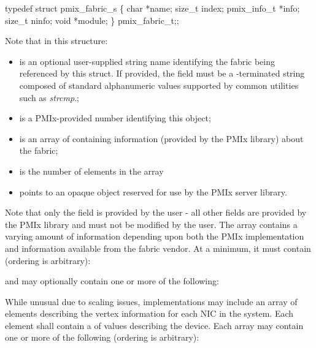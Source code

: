 \cspecificstart
\begin{codepar}
typedef struct pmix_fabric_s \{
    char *name;
    size_t index;
    pmix_info_t *info;
    size_t ninfo;
    void *module;
\} pmix_fabric_t;;
\end{codepar}
\cspecificend

Note that in this structure:

\begin{itemize}
    \item {} is an optional user-supplied string name identifying the fabric being referenced by this struct. If provided, the field must be a -terminated string composed of standard alphanumeric values supported by common utilities such as \textit{strcmp}.;
    \item {} is a \ac{PMIx}-provided number identifying this object;
    \item {} is an array of  containing information (provided by the \ac{PMIx} library) about the fabric;
    \item {} is the number of elements in the  array
    \item {} points to an opaque object reserved for use by the \ac{PMIx} server library.
\end{itemize}

Note that only the  field is provided by the user - all other fields are provided by the \ac{PMIx} library and must not be modified by the user. The  array contains a varying amount of information depending upon both the \ac{PMIx} implementation and information available from the fabric vendor. At a minimum, it must contain (ordering is arbitrary):

\reqattrstart


\reqattrend

and may optionally contain one or more of the following:

\optattrstart
{}

While unusual due to scaling issues, implementations may include an array of  elements describing the vertex information for each \ac{NIC} in the system. Each element shall contain a  of  values describing the device. Each array may contain one or more of the following (ordering is arbitrary):

